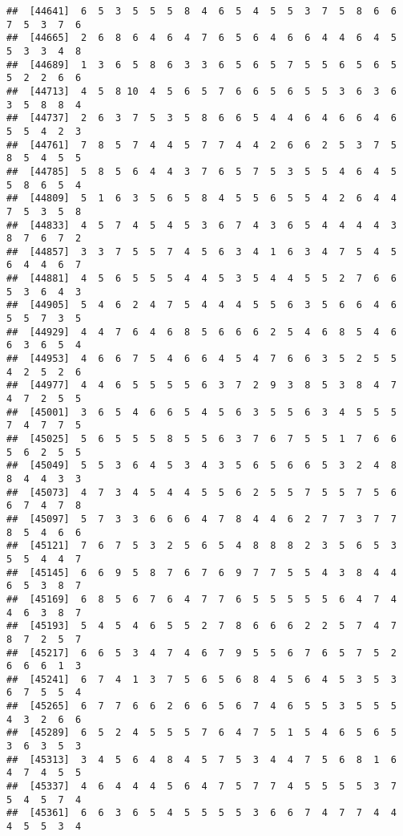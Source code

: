 \documentclass[
]{book}
\begin{document}
\begin{verbatim}
##  [44641]  6  5  3  5  5  5  8  4  6  5  4  5  5  3  7  5  8  6  6  7  5  3  7  6
##  [44665]  2  6  8  6  4  6  4  7  6  5  6  4  6  6  4  4  6  4  5  5  3  3  4  8
##  [44689]  1  3  6  5  8  6  3  3  6  5  6  5  7  5  5  6  5  6  5  5  2  2  6  6
##  [44713]  4  5  8 10  4  5  6  5  7  6  6  5  6  5  5  3  6  3  6  3  5  8  8  4
##  [44737]  2  6  3  7  5  3  5  8  6  6  5  4  4  6  4  6  6  4  6  5  5  4  2  3
##  [44761]  7  8  5  7  4  4  5  7  7  4  4  2  6  6  2  5  3  7  5  8  5  4  5  5
##  [44785]  5  8  5  6  4  4  3  7  6  5  7  5  3  5  5  4  6  4  5  5  8  6  5  4
##  [44809]  5  1  6  3  5  6  5  8  4  5  5  6  5  5  4  2  6  4  4  7  5  3  5  8
##  [44833]  4  5  7  4  5  4  5  3  6  7  4  3  6  5  4  4  4  4  3  8  7  6  7  2
##  [44857]  3  3  7  5  5  7  4  5  6  3  4  1  6  3  4  7  5  4  5  6  4  4  6  7
##  [44881]  4  5  6  5  5  5  4  4  5  3  5  4  4  5  5  2  7  6  6  5  3  6  4  3
##  [44905]  5  4  6  2  4  7  5  4  4  4  5  5  6  3  5  6  6  4  6  5  5  7  3  5
##  [44929]  4  4  7  6  4  6  8  5  6  6  6  2  5  4  6  8  5  4  6  6  3  6  5  4
##  [44953]  4  6  6  7  5  4  6  6  4  5  4  7  6  6  3  5  2  5  5  4  2  5  2  6
##  [44977]  4  4  6  5  5  5  5  6  3  7  2  9  3  8  5  3  8  4  7  4  7  2  5  5
##  [45001]  3  6  5  4  6  6  5  4  5  6  3  5  5  6  3  4  5  5  5  7  4  7  7  5
##  [45025]  5  6  5  5  5  8  5  5  6  3  7  6  7  5  5  1  7  6  6  5  6  2  5  5
##  [45049]  5  5  3  6  4  5  3  4  3  5  6  5  6  6  5  3  2  4  8  8  4  4  3  3
##  [45073]  4  7  3  4  5  4  4  5  5  6  2  5  5  7  5  5  7  5  6  6  7  4  7  8
##  [45097]  5  7  3  3  6  6  6  4  7  8  4  4  6  2  7  7  3  7  7  8  5  4  6  6
##  [45121]  7  6  7  5  3  2  5  6  5  4  8  8  8  2  3  5  6  5  3  5  5  4  4  7
##  [45145]  6  6  9  5  8  7  6  7  6  9  7  7  5  5  4  3  8  4  4  6  5  3  8  7
##  [45169]  6  8  5  6  7  6  4  7  7  6  5  5  5  5  5  6  4  7  4  4  6  3  8  7
##  [45193]  5  4  5  4  6  5  5  2  7  8  6  6  6  2  2  5  7  4  7  8  7  2  5  7
##  [45217]  6  6  5  3  4  7  4  6  7  9  5  5  6  7  6  5  7  5  2  6  6  6  1  3
##  [45241]  6  7  4  1  3  7  5  6  5  6  8  4  5  6  4  5  3  5  3  6  7  5  5  4
##  [45265]  6  7  7  6  6  2  6  6  5  6  7  4  6  5  5  3  5  5  5  4  3  2  6  6
##  [45289]  6  5  2  4  5  5  5  7  6  4  7  5  1  5  4  6  5  6  5  3  6  3  5  3
##  [45313]  3  4  5  6  4  8  4  5  7  5  3  4  4  7  5  6  8  1  6  4  7  4  5  5
##  [45337]  4  6  4  4  4  5  6  4  7  5  7  7  4  5  5  5  5  3  7  5  4  5  7  4
##  [45361]  6  6  3  6  5  4  5  5  5  5  3  6  6  7  4  7  7  4  4  4  5  5  3  4

\end{verbatim}
\end{document}
